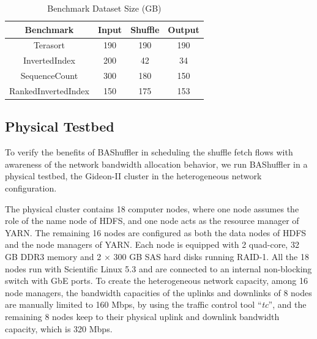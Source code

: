 \documentclass[10pt,journal,compsoc]{IEEEtran}
\begin{document}
\begin{table}[!t]
\renewcommand{\arraystretch}{1}
\caption{Benchmark Dataset Size (GB)}
\label{table:benchmark}
\centering
\begin{tabularx}{.4\textwidth}{c||c|c|c}
\hline
\textbf{Benchmark} & \textbf{Input} & \textbf{Shuffle} & \textbf{Output} \\
\hline
Terasort & 190 & 190 & 190\\
\hline
InvertedIndex & 200 & 42 & 34 \\
\hline
SequenceCount & 300 & 180 & 150 \\
\hline
RankedInvertedIndex & 150 & 175 & 153\\
\hline
\end{tabularx}
\end{table}

\subsection{Physical Testbed}
To verify the benefits of BAShuffler in scheduling the shuffle fetch
flows with awareness of the network bandwidth allocation behavior,
we run BAShuffler in a physical testbed, the
Gideon-II cluster \cite{gideon} in the heterogeneous network configuration.


The physical cluster contains 18 computer nodes, where one node
assumes the role of the name node of HDFS, and
one node acts as the resource manager of YARN. 
The remaining 16 nodes are configured as both the data nodes of HDFS
and the node managers of YARN.
Each node is equipped with 2 quad-core, 32 GB DDR3 memory and
2 $\times$ 300 GB SAS hard disks running RAID-1. 
All the 18 nodes run with Scientific Linux 5.3 and are connected to an internal non-blocking switch with GbE ports. 
To create the heterogeneous network capacity, among 16 node managers, 
the bandwidth capacities of the uplinks and downlinks of 8 nodes are
manually limited to 160 Mbps,
by using the traffic control tool ``\emph{tc}'', 
and the remaining 8 nodes keep to their physical uplink and downlink
bandwidth capacity, which is 320 Mbps.
\end{document}
